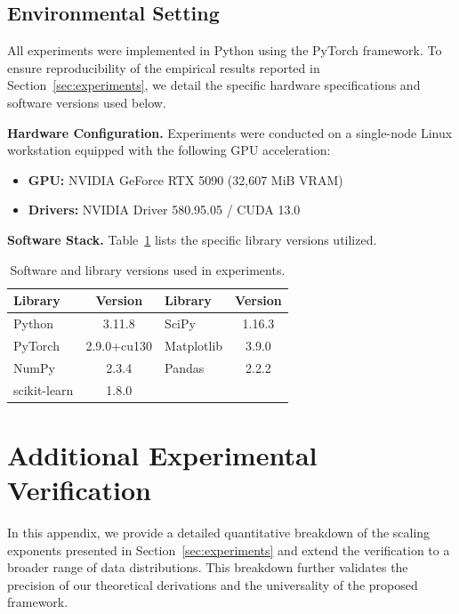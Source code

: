 \documentclass{article}
\theoremstyle{plain}
\theoremstyle{definition}
\theoremstyle{remark}
\begin{document}
\subsection{Environmental Setting}
\label{app:env_details}

All experiments were implemented in Python using the PyTorch framework. To ensure reproducibility of the empirical results reported in Section~\ref{sec:experiments}, we detail the specific hardware specifications and software versions used below.

\textbf{Hardware Configuration.} Experiments were conducted on a single-node Linux workstation equipped with the following GPU acceleration:
\begin{itemize}
    \item \textbf{GPU:} NVIDIA GeForce RTX 5090 (32,607 MiB VRAM)
    \item \textbf{Drivers:} NVIDIA Driver 580.95.05 / CUDA 13.0
\end{itemize}

\textbf{Software Stack.} Table~\ref{tab:software_versions} lists the specific library versions utilized.

\begin{table}[h]
    \centering
    \caption{Software and library versions used in experiments.}
    \label{tab:software_versions}
    \vspace{0.2cm}
    \begin{small}
    \begin{tabular}{lc|lc}
    \toprule
    \textbf{Library} & \textbf{Version} & \textbf{Library} & \textbf{Version} \\
    \midrule
    Python & 3.11.8 & SciPy & 1.16.3 \\
    PyTorch & 2.9.0+cu130 & Matplotlib & 3.9.0 \\
    NumPy & 2.3.4 & Pandas & 2.2.2 \\
    scikit-learn & 1.8.0 & & \\
    \bottomrule
    \end{tabular}
    \end{small}
\end{table}
\section{Additional Experimental Verification}
\label{app:additional_experiments}

In this appendix, we provide a detailed quantitative breakdown of the scaling exponents presented in Section~\ref{sec:experiments} and extend the verification to a broader range of data distributions. This breakdown further validates the precision of our theoretical derivations and the universality of the proposed framework.
\end{document}
